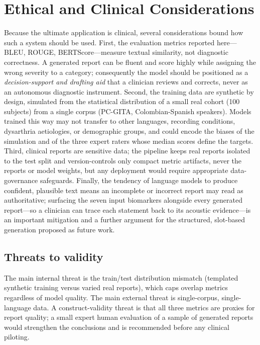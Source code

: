 \documentclass[11pt,twocolumn]{article}
\begin{document}
\section{Ethical and Clinical Considerations}
Because the ultimate application is clinical, several considerations bound how such a system
should be used. First, the evaluation metrics reported here---BLEU, ROUGE, BERTScore---measure
textual similarity, not diagnostic correctness. A generated report can be fluent and score highly
while assigning the wrong severity to a category; consequently the model should be positioned as a
\emph{decision-support and drafting aid} that a clinician reviews and corrects, never as an
autonomous diagnostic instrument. Second, the training data are synthetic by design, simulated
from the statistical distribution of a small real cohort (100 subjects) from a single corpus
(PC-GITA, Colombian-Spanish speakers). Models trained this way may not transfer to other
languages, recording conditions, dysarthria aetiologies, or demographic groups, and could encode
the biases of the simulation and of the three expert raters whose median scores define the
targets. Third, clinical reports are sensitive data; the pipeline keeps real reports isolated to
the test split and version-controls only compact metric artifacts, never the reports or model
weights, but any deployment would require appropriate data-governance safeguards. Finally, the
tendency of language models to produce confident, plausible text means an incomplete or incorrect
report may read as authoritative; surfacing the seven input biomarkers alongside every generated
report---so a clinician can trace each statement back to its acoustic evidence---is an important
mitigation and a further argument for the structured, slot-based generation proposed as future
work.

\subsection*{Threats to validity}
The main internal threat is the train/test distribution mismatch (templated synthetic training
versus varied real reports), which caps overlap metrics regardless of model quality. The main
external threat is single-corpus, single-language data. A construct-validity threat is that all
three metrics are proxies for report quality; a small expert human evaluation of a sample of
generated reports would strengthen the conclusions and is recommended before any clinical piloting.
\end{document}
